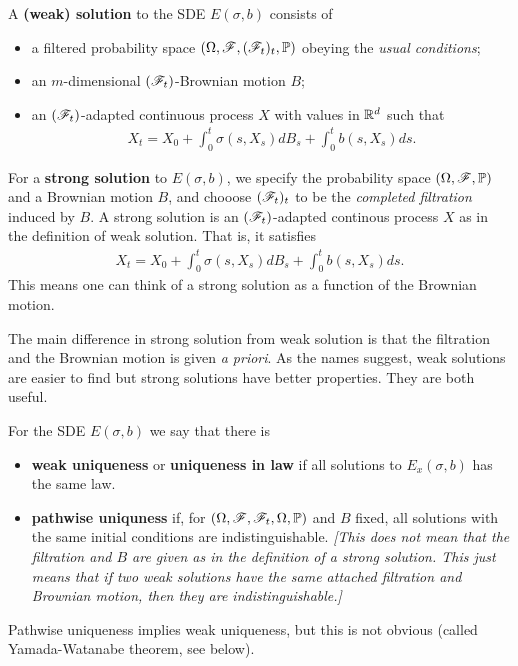 \documentclass[12pt,a4paper]{article}
\renewenvironment{i}
{\begin{itemize} 
	}%
	{\end{itemize}
}
\begin{document}
 A \textbf{(weak) solution} to the SDE $E(\sigma, b)$ consists of
\begin{i}
\item a filtered probability space $(\Omega, \mathscr{F}, (\mathscr{F}_t)_{t}, \mathbb{P})$ obeying the \emph{usual conditions};
\item an $m$-dimensional $(\mathscr{F}_t)$-Brownian motion $B$;
\item an $(\mathscr{F}_t)$-adapted continuous process $X$ with values in $\mathbb{R}^d$ such that
\begin{align*}
X_t = X_0 + \int_0^t \sigma(s, X_s) dB_s + \int_0^t b(s, X_s) ds.
\end{align*} 
\end{i}
\s

 For a \textbf{strong solution} to $E(\sigma, b)$, we specify the probability space $(\Omega, \mathscr{F}, \mathbb{P})$ and a Brownian motion $B$, and chooose $(\mathscr{F}_t)_t$ to be the \emph{completed filtration} induced by $B$. A strong solution is an $(\mathscr{F}_t)$-adapted continous process $X$ as in the definition of weak solution. That is, it satisfies
\begin{align*}
X_t = X_0 + \int_0^t \sigma(s, X_s) dB_s + \int_0^t b(s, X_s) ds.
\end{align*} 
This means one can think of a strong solution as a function of the Brownian motion.
\s

The main difference in strong solution from weak solution is that the filtration and the Brownian motion is given \textit{a priori}. As the names suggest, weak solutions are easier to find but strong solutions have better properties. They are both useful.
\s

 For the SDE $E(\sigma, b)$ we say that there is
\begin{i}
\item \textbf{weak uniqueness} or \textbf{uniqueness in law} if all solutions to $E_x(\sigma, b)$ has the same law.
\item \textbf{pathwise uniquness} if, for $(\Omega, \mathscr{F}, \mathscr{F}_t, \Omega, \mathbb{P})$ and $B$ fixed, all solutions with the same initial conditions are indistinguishable. \emph{[This does not mean that the filtration and $B$ are given as in the definition of a strong solution. This just means that if two weak solutions have the same attached filtration and Brownian motion, then they are indistinguishable.]}
\end{i}
Pathwise uniqueness implies weak uniqueness, but this is not obvious (called Yamada-Watanabe theorem, see below).
\s
\end{document}
